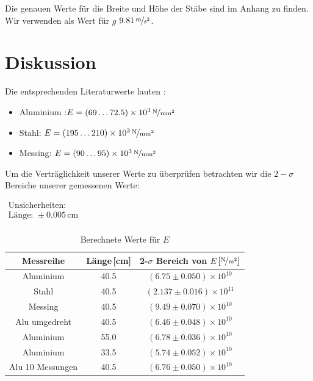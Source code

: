 \documentclass[11pt,a4paper]{article}
\begin{document}
Die genauen Werte f\"ur die Breite und H\"ohe der St\"abe sind im Anhang zu finden. Wir verwenden als Wert f\"ur $g$ $9.81\,\nicefrac{\mathrm{m}}{\mathrm{s}^2}$.

\section{Diskussion}

Die entsprechenden Literaturwerte lauten \cite{Anleitung}:

\begin{itemize}
\item Aluminium :$E=(69\ldots72.5)\times10^3\,\nicefrac{\mathrm{N}}{\mathrm{mm^2}}$
\item Stahl: $E=(195\ldots210)\times10^3\,\nicefrac{\mathrm{N}}{\mathrm{mm^2}}$
\item Messing: $E=(90\ldots95)\times10^3\,\nicefrac{\mathrm{N}}{\mathrm{mm^2}}$
\end{itemize}

Um die Vertr\"aglichkeit unserer Werte zu \"uberpr\"ufen betrachten wir die $2-\sigma$ Bereiche unserer gemessenen Werte:

\begin{table}[h]
\centering
\caption{Berechnete Werte f\"ur $E$} \vspace{11pt}
$\begin{array}{l}
\textrm{Unsicherheiten:}\\
\textrm{L\"ange: } \pm 0.005\,\textrm{cm}\\
\end{array}$
\begin{tabular}{ccc}
\toprule
\textrm{Messreihe} & \textrm{L\"ange}\,[\textrm{cm}] & \textrm{2-}$\sigma$\textrm{ Bereich von }$E$\,$\left[\nicefrac{\mathrm{N}}{\mathrm{m^2}}\right]$ \\
\midrule 
\textrm{Aluminium} & 40.5 & $(6.75\pm0.050)\times10^{10}$ \\
\textrm{Stahl} & 40.5 & $(2.137\pm0.016)\times10^{11}$ \\
\textrm{Messing} & 40.5 & $(9.49\pm0.070)\times10^{10}$ \\
\hline
\textrm{Alu umgedreht} & 40.5 & $(6.46\pm0.048)\times10^{10}$ \\
\textrm{Aluminium} & 55.0 & $(6.78\pm0.036)\times10^{10}$ \\ 
\textrm{Aluminium} & 33.5 & $(5.74\pm0.052)\times10^{10}$ \\ 
\textrm{Alu 10 Messungen} & 40.5 & $(6.76\pm0.050)\times10^{10}$ \\ 
\bottomrule
\end{tabular}
\label{Tab:1}
\end{table}
\end{document}
